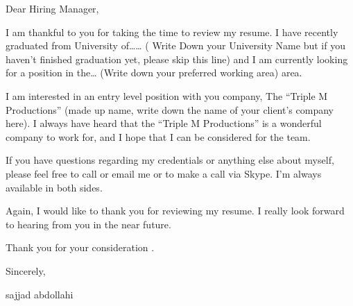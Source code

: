 \documentclass[A4,12pt]{article}
\begin{document}
\vspace{40pt}

{
\Large

Dear Hiring Manager,

}

\justifying





\vspace{40pt}


I am thankful to you for taking the time to review my resume. I have recently graduated from University of…… ( Write Down your University Name but if you haven’t finished graduation yet, please skip this line) and I am currently looking for a position in the… (Write down your preferred  working area) area.

\vspace{10pt}

I am interested in an entry level position with you company, The “Triple M Productions” (made up name, write down the name of your client’s company here). I always have heard that the “Triple M Productions”  is a wonderful company to work for, and I hope that I can be considered for the team.

\vspace{10pt}

If you have questions regarding my credentials or anything else about myself, please feel free to call or email me or to make a call via Skype. I’m always available in both sides.

\vspace{10pt}

Again, I would like to thank you for reviewing my resume. I really look forward to hearing from you in the near future.



\vspace{40pt}

\noindent
Thank you for your consideration .

\noindent
Sincerely,

\noindent
sajjad abdollahi












\end{document}

